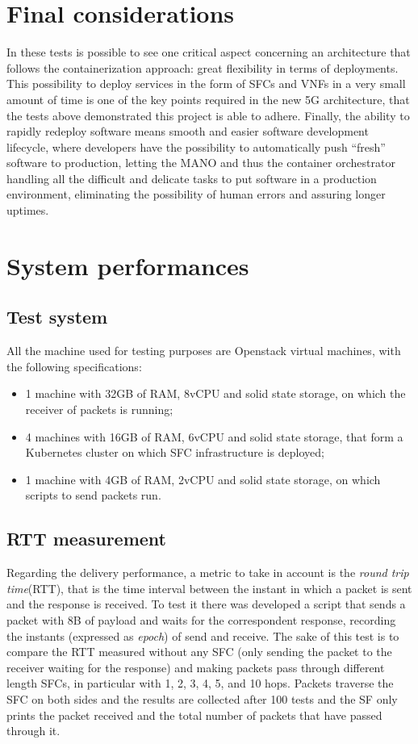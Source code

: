 \section{Final considerations}

In these tests is possible to see one critical aspect concerning an architecture
that follows the containerization approach: great flexibility in terms of
deployments. This possibility to deploy services in the form of SFCs and VNFs in
a very small amount of time is one of the key points required in the new 5G
architecture, that the tests above demonstrated this project is able to adhere.
Finally, the ability to rapidly redeploy software means smooth and easier
software development lifecycle, where developers have the possibility to
automatically push ``fresh'' software to production, letting the MANO and thus
the container orchestrator handling all the difficult and delicate tasks to put
software in a production environment, eliminating the possibility of human
errors and assuring longer uptimes.

\section{System performances}

\subsection{Test system}
All the machine used for testing purposes are Openstack virtual machines, with
the following specifications:
\begin{itemize}
\item 1 machine with 32GB of RAM, 8vCPU and solid state storage, on which the
receiver of packets is running;
\item 4 machines with 16GB of RAM, 6vCPU and solid state storage, that form a
Kubernetes cluster on which SFC infrastructure is deployed;
\item 1 machine with 4GB of RAM, 2vCPU and solid state storage, on which
scripts to send packets run.
\end{itemize}

\subsection{RTT measurement}
Regarding the delivery performance, a metric to take in account is the
\emph{round trip time}(RTT), that is the time interval between the instant in
which a packet is sent and the response is received. To test it there was
developed a script that sends a packet with 8B of payload and waits for the
correspondent response, recording the instants (expressed as \emph{epoch}) of
send and receive. The sake of this test is to compare the RTT measured without
any SFC (only sending the packet to the receiver waiting for the response) and
making packets pass through different length SFCs, in particular with 1, 2, 3,
4, 5, and 10 hops. Packets traverse the SFC on both sides and the results are
collected after 100 tests and the SF only prints the packet received and the
total number of packets that have passed through it.

